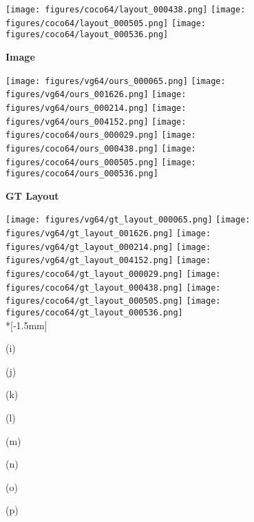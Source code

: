 \documentclass[10pt,twocolumn,letterpaper]{article}
\begin{document}
\begin{figure*}[ht!]
  \texttt{[image: figures/coco64/layout\_000438.png]}
  \texttt{[image: figures/coco64/layout\_000505.png]}
  \texttt{[image: figures/coco64/layout\_000536.png]} \\
  \begin{rotate}{90}
    \hspace{6mm}\textbf{Image}
  \end{rotate}
  \hspace*{0.5mm}
  \texttt{[image: figures/vg64/ours\_000065.png]}
  \texttt{[image: figures/vg64/ours\_001626.png]}
  \texttt{[image: figures/vg64/ours\_000214.png]}
  \texttt{[image: figures/vg64/ours\_004152.png]} 
  \texttt{[image: figures/coco64/ours\_000029.png]}
  \texttt{[image: figures/coco64/ours\_000438.png]}
  \texttt{[image: figures/coco64/ours\_000505.png]}
  \texttt{[image: figures/coco64/ours\_000536.png]} \\
  \begin{rotate}{90}
    \hspace{1mm}
    \textbf{GT Layout}
  \end{rotate}
  \hspace*{0.5mm}
  \texttt{[image: figures/vg64/gt\_layout\_000065.png]}
  \texttt{[image: figures/vg64/gt\_layout\_001626.png]}
  \texttt{[image: figures/vg64/gt\_layout\_000214.png]}
  \texttt{[image: figures/vg64/gt\_layout\_004152.png]} 
  \texttt{[image: figures/coco64/gt\_layout\_000029.png]}
  \texttt{[image: figures/coco64/gt\_layout\_000438.png]}
  \texttt{[image: figures/coco64/gt\_layout\_000505.png]}
  \texttt{[image: figures/coco64/gt\_layout\_000536.png]} \\*[-1.5mm]
  \begin{minipage}{\qualsize} \centering\scriptsize (i) \end{minipage}
  \begin{minipage}{\qualsize} \centering\scriptsize (j) \end{minipage}
  \begin{minipage}{\qualsize} \centering\scriptsize (k) \end{minipage}
  \begin{minipage}{\qualsize} \centering\scriptsize (l) \end{minipage}
  \begin{minipage}{\qualsize} \centering\scriptsize (m) \end{minipage}
  \begin{minipage}{\qualsize} \centering\scriptsize (n) \end{minipage}
  \begin{minipage}{\qualsize} \centering\scriptsize (o) \end{minipage}
  \begin{minipage}{\qualsize} \centering\scriptsize (p) \end{minipage} \\


\end{figure*}
\end{document}
